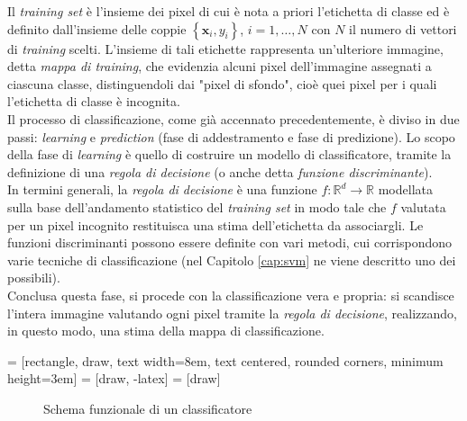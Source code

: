 Il \emph{training set} è l'insieme dei pixel di cui è nota a priori l'etichetta di classe ed è definito dall'insieme delle coppie $\left\lbrace \mathbf{x}_i,y_i \right\rbrace $, $i=1,\ldots,N$ con $N$ il numero di vettori di \emph{training} scelti. L'insieme di tali etichette rappresenta un'ulteriore immagine, detta  \emph{mappa di training}, che evidenzia alcuni pixel dell'immagine assegnati a ciascuna classe, distinguendoli dai "pixel di sfondo", cioè quei pixel per i quali l'etichetta di classe è incognita.
\\
Il processo di classificazione, come già accennato precedentemente, è diviso in due passi: \emph{learning} e \emph{prediction} (fase di addestramento e fase di predizione). Lo scopo della fase di \emph{learning} è quello di costruire un modello di classificatore, tramite la definizione di una \emph{regola di decisione} (o anche detta \emph{funzione discriminante}). \\
In termini generali, la \emph{regola di decisione} è una funzione $f:\mathbb{R}^d\rightarrow\mathbb{R}$ modellata sulla base dell'andamento statistico del \emph{training set} in modo tale che $f$ valutata per un pixel incognito restituisca una stima dell'etichetta da associargli. Le funzioni discriminanti possono essere definite con vari metodi, cui corrispondono varie tecniche di classificazione (nel Capitolo \ref{cap:svm} ne viene descritto uno dei possibili). \\
Conclusa questa fase, si procede con la classificazione vera e propria: si scandisce l'intera immagine valutando ogni pixel tramite la \emph{regola di decisione}, realizzando, in questo modo, una stima della mappa di classificazione.

 = [rectangle, draw, %
     text width=8em, text centered, rounded corners, minimum height=3em]
 = [draw, -latex]
 = [draw]


\begin{figure}[!ht]
\center
{}
    \caption{Schema funzionale di un classificatore}
    \label{fig:flowchart_classificatore}
  \end{figure}
\clearpage


